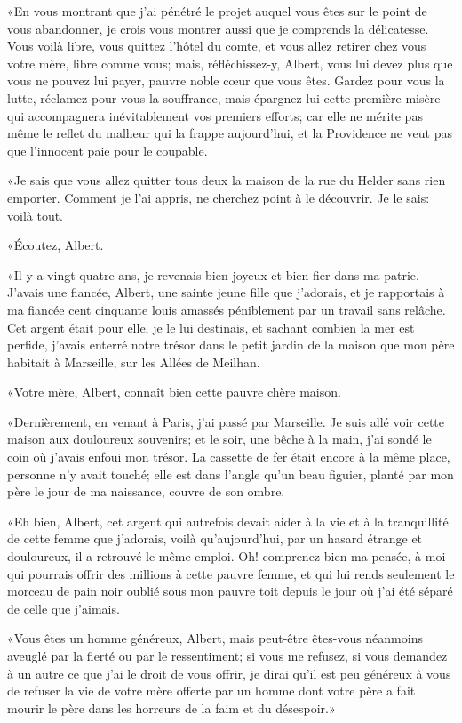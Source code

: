 «En vous montrant que j'ai pénétré le projet auquel vous êtes sur le point de vous abandonner, je crois vous montrer aussi que je comprends la délicatesse. Vous voilà libre, vous quittez l'hôtel du comte, et vous allez retirer chez vous votre mère, libre comme vous; mais, réfléchissez-y, Albert, vous lui devez plus que vous ne pouvez lui payer, pauvre noble cœur que vous êtes. Gardez pour vous la lutte, réclamez pour vous la souffrance, mais épargnez-lui cette première misère qui accompagnera inévitablement vos premiers efforts; car elle ne mérite pas même le reflet du malheur qui la frappe aujourd'hui, et la Providence ne veut pas que l'innocent paie pour le coupable. 

«Je sais que vous allez quitter tous deux la maison de la rue du Helder sans rien emporter. Comment je l'ai appris, ne cherchez point à le découvrir. Je le sais: voilà tout. 

«Écoutez, Albert. 

«Il y a vingt-quatre ans, je revenais bien joyeux et bien fier dans ma patrie. J'avais une fiancée, Albert, une sainte jeune fille que j'adorais, et je rapportais à ma fiancée cent cinquante louis amassés péniblement par un travail sans relâche. Cet argent était pour elle, je le lui destinais, et sachant combien la mer est perfide, j'avais enterré notre trésor dans le petit jardin de la maison que mon père habitait à Marseille, sur les Allées de Meilhan. 

«Votre mère, Albert, connaît bien cette pauvre chère maison. 

«Dernièrement, en venant à Paris, j'ai passé par Marseille. Je suis allé voir cette maison aux douloureux souvenirs; et le soir, une bêche à la main, j'ai sondé le coin où j'avais enfoui mon trésor. La cassette de fer était encore à la même place, personne n'y avait touché; elle est dans l'angle qu'un beau figuier, planté par mon père le jour de ma naissance, couvre de son ombre. 

«Eh bien, Albert, cet argent qui autrefois devait aider à la vie et à la tranquillité de cette femme que j'adorais, voilà qu'aujourd'hui, par un hasard étrange et douloureux, il a retrouvé le même emploi. Oh! comprenez bien ma pensée, à moi qui pourrais offrir des millions à cette pauvre femme, et qui lui rends seulement le morceau de pain noir oublié sous mon pauvre toit depuis le jour où j'ai été séparé de celle que j'aimais. 

«Vous êtes un homme généreux, Albert, mais peut-être êtes-vous néanmoins aveuglé par la fierté ou par le ressentiment; si vous me refusez, si vous demandez à un autre ce que j'ai le droit de vous offrir, je dirai qu'il est peu généreux à vous de refuser la vie de votre mère offerte par un homme dont votre père a fait mourir le père dans les horreurs de la faim et du désespoir.» 

